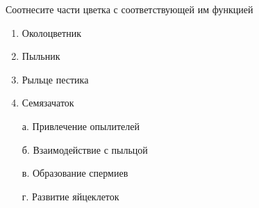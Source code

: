 
Соотнесите
части цветка с соответствующей им функцией

\begin{multicols}{2}
    {
        \begin{enumerate}
            \item Околоцветник
            \item Пыльник
            \item Рыльце пестика
            \item Семязачаток
        \end{enumerate}
    }
    {
        \begin{enumerate}
            \item[а.] Привлечение опылителей
            \item[б.] Взаимодействие с пыльцой
            \item[в.] Образование спермиев
            \item[г.] Развитие яйцеклеток
        \end{enumerate}
    }
\end{multicols}


\explanationSection

